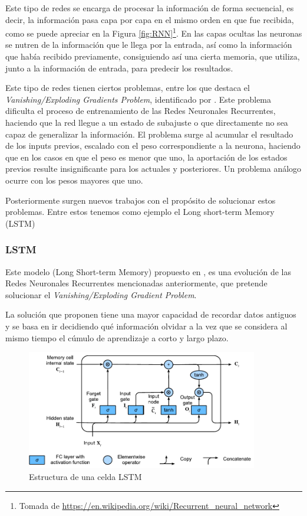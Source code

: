 Este tipo de redes se encarga de procesar la información de forma secuencial, es decir, la información pasa capa por capa en el mismo orden en que fue recibida, como se puede apreciar en la Figura \ref{fig:RNN}\footnote{Tomada de \url{https://en.wikipedia.org/wiki/Recurrent_neural_network}}. En las capas ocultas las neuronas se nutren de la información que le llega por la entrada, así como la información que había recibido previamente, consiguiendo así una cierta memoria, que utiliza, junto a la información de entrada, para predecir los resultados. 

Este tipo de redes tienen ciertos problemas, entre los que destaca el \textit{Vanishing/Exploding Gradients Problem}, identificado por \cite{hochreiter1991untersuchungen}.  Este problema dificulta el proceso de entrenamiento de las Redes Neuronales Recurrentes, haciendo que la red llegue a un estado de subajuste o que directamente no sea capaz de generalizar la información. El problema surge al acumular el resultado de los inputs previos, escalado con el peso correspondiente a la neurona, haciendo que en los casos en que el peso es menor que uno, la aportación de los estados previos resulte insignificante para los actuales y posteriores. Un problema análogo ocurre con los pesos mayores que uno.

Posteriormente surgen nuevos trabajos con el propósito de solucionar estos problemas. Entre estos tenemos como ejemplo el Long short-term Memory (LSTM)

\subsubsection{LSTM}

Este modelo (Long Short-term Memory) propuesto en \cite{hochreiter1997long}, es una evolución de las Redes Neuronales Recurrentes mencionadas anteriormente, que pretende solucionar el \textit{Vanishing/Exploding Gradient Problem}.

La solución que proponen tiene una mayor capacidad de recordar datos antiguos y se basa en ir decidiendo qué información olvidar a la vez que se considera al mismo tiempo el cúmulo de aprendizaje a corto y largo plazo.

\begin{figure}[h]
	\centering
	\includegraphics[width = 0.9\textwidth]{Imagenes/Vectorial/LSTM.pdf}
	\caption{Estructura de una celda LSTM}%
	\label{fig:LSTM}
\end{figure}

